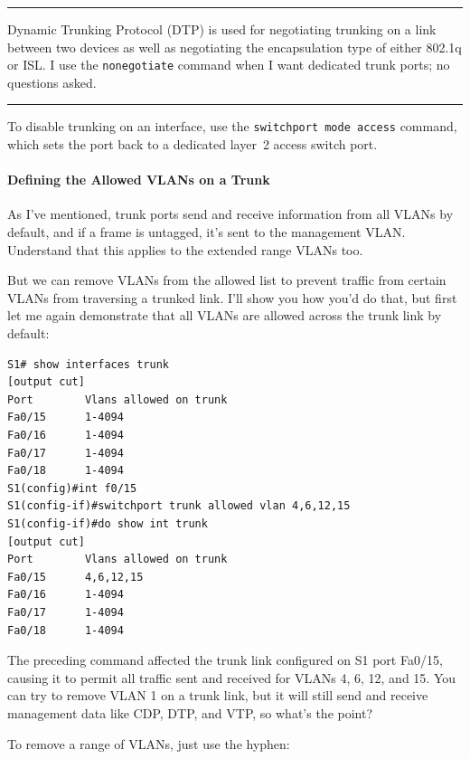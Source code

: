 \begin{center}\rule{0.5\linewidth}{0.5pt}\end{center}

Dynamic Trunking Protocol (DTP) is used
for negotiating trunking on a link between two devices as well as
negotiating the encapsulation type of either 802.1q or ISL. I use the
\texttt{nonegotiate} command when I want dedicated trunk ports; no
questions asked.

\begin{center}\rule{0.5\linewidth}{0.5pt}\end{center}

To disable trunking on an interface, use the
\texttt{switchport\ mode\ access} command, which sets the port back to a
dedicated layer~2 access switch port.

\paragraph{Defining the Allowed VLANs on a Trunk}

As I've mentioned, trunk ports send and receive information from all
VLANs by default, and if a frame is untagged, it's sent to the
management VLAN. Understand that this applies to the extended range
VLANs too.

But we can remove VLANs from the allowed list to prevent traffic from
certain VLANs from traversing a trunked link. I'll show you how you'd do
that, but first let me again demonstrate that all VLANs are allowed
across the trunk link by default:

\begin{verbatim}
S1# show interfaces trunk
[output cut]
Port        Vlans allowed on trunk
Fa0/15      1-4094
Fa0/16      1-4094
Fa0/17      1-4094
Fa0/18      1-4094
S1(config)#int f0/15
S1(config-if)#switchport trunk allowed vlan 4,6,12,15
S1(config-if)#do show int trunk
[output cut]
Port        Vlans allowed on trunk
Fa0/15      4,6,12,15
Fa0/16      1-4094
Fa0/17      1-4094
Fa0/18      1-4094
\end{verbatim}

The preceding command
affected the trunk link configured on S1 port Fa0/15, causing it to
permit all traffic sent and received for VLANs 4, 6, 12, and 15. You can
try to remove VLAN 1 on a trunk link, but it will still send and receive
management data like CDP, DTP, and VTP, so what's the point?

To remove a range of VLANs, just use the hyphen:

